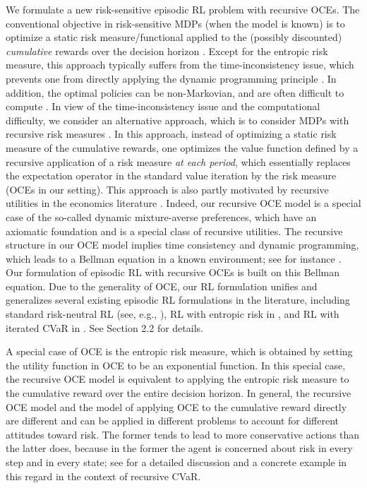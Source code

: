 \documentclass[11pt]{article}
\newcommand{\1}{\mathbbm{1}}
\begin{document}




We formulate a new risk-sensitive episodic RL problem with recursive OCEs.
The conventional objective in risk-sensitive MDPs (when the model is known) is to optimize a static risk measure/functional applied to the (possibly discounted) \textit{cumulative} rewards over the decision horizon \citep{ howard1972risk,marcus1997risk}. 
Except for the entropic risk measure, this approach typically suffers from the time-inconsistency issue, which prevents one from directly applying the dynamic programming principle \citep{artzner2007coherent}. In addition, the optimal policies can be non-Markovian, and are often difficult to compute \citep{mannor2011mean, du2022risk}. In view of the time-inconsistency issue and the computational difficulty, we consider an alternative approach, which is to consider MDPs with recursive risk measures  
\citep{ruszczynski2010risk,shen2013risk,bauerle2022markov}. In this approach, instead of optimizing a static risk measure of the cumulative rewards, one optimizes the value function
defined by a recursive application of a risk measure \textit{at each period}, which essentially replaces the expectation operator in the standard value iteration by the risk measure (OCEs in our setting).
This approach is also partly motivated by recursive utilities in the economics literature \citep{kreps1978temporal,epstein1989substitution}. Indeed, our recursive OCE model is a special case of the so-called dynamic mixture-averse preferences, which have an axiomatic foundation \citep{sarver2018dynamic} and is a special class of recursive utilities. The recursive structure in our OCE model implies time consistency and dynamic programming, which leads to a Bellman equation in a known environment; see for instance \citet{bauerle2022markov}. Our formulation of episodic RL with recursive OCEs is built on this Bellman equation. Due to the generality of OCE, our RL formulation unifies and generalizes several existing episodic RL formulations in the literature, including standard risk-neutral RL (see, e.g., \citet{azar2017minimax}), RL with entropic risk in \citet{fei2020risk}, and RL with iterated CVaR in \citet{du2022risk}. See Section 2.2 for details.

A special case of OCE is the entropic risk measure, which is obtained by setting the utility function in OCE to be an exponential function. In this special case, the recursive OCE model is equivalent to applying the entropic risk measure to the cumulative reward over the entire decision horizon. In general, the recursive OCE model and the model of applying OCE to the cumulative reward directly are different and can be applied in different problems to account for different attitudes toward risk. The former tends to lead to more conservative actions than the latter does, because in the former the agent is concerned about risk in every step and in every state; see \citet{du2022risk} for a detailed discussion and a concrete example in this regard in the context of recursive CVaR.
\end{document}
